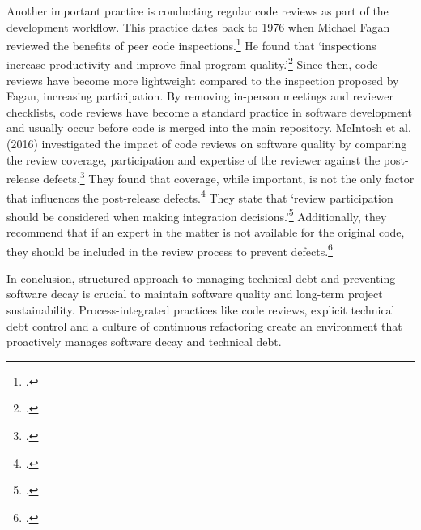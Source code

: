 Another important practice is conducting regular code reviews as part of the development workflow. This practice dates back to 1976 when Michael Fagan reviewed the benefits of peer code inspections.\footcite[183]{faganDesignCodeInspections1976}
He found that `inspections increase productivity and improve final program quality.'\footcite[205]{faganDesignCodeInspections1976}
Since then, code reviews have become more lightweight compared to the inspection proposed by Fagan, increasing participation. By removing in-person meetings and reviewer checklists, code reviews have become a standard practice in software development and usually occur before code is merged into the main repository.
McIntosh et al. (2016) investigated the impact of code reviews on software quality by comparing the review coverage, participation and expertise of the reviewer against the post-release defects.\footcite[6]{mcintoshEmpiricalStudyImpact2016}
They found that coverage, while important, is not the only factor that influences the post-release defects.\footcite[39]{mcintoshEmpiricalStudyImpact2016}
They state that `review participation should be considered when making integration decisions.'\footcite[39]{mcintoshEmpiricalStudyImpact2016}
Additionally, they recommend that if an expert in the matter is not available for the original code, they should be included in the review process to prevent defects.\footcite[39]{mcintoshEmpiricalStudyImpact2016}

In conclusion, structured approach to managing technical debt and preventing software decay is crucial to maintain software quality and long-term project sustainability.
Process-integrated practices like code reviews, explicit technical debt control and a culture of continuous refactoring create an environment that proactively manages software decay and technical debt.

